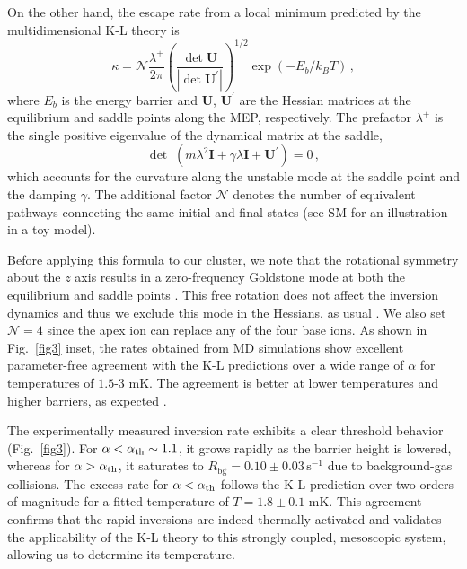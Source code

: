 \documentclass[aps,prl,twocolumn,superscriptaddress,showpacs,floatfix]{revtex4-2}
\begin{document}
On the other hand, the escape rate from a local minimum predicted by the multidimensional K-L theory is~\cite{Langer1969}
\begin{equation}
\kappa = \mathcal{N} \frac{\lambda^+}{2\pi} \left( \frac{\det \mathbf{U}}{|\det \mathbf{U}^{\prime}|} \right)^{1/2} \exp(-E_b /k_B T) \, ,
\end{equation}
where $E_b$ is the energy barrier and $\mathbf{U}$, $\mathbf{U}^{\prime}$ are the Hessian matrices at the equilibrium and saddle points along the MEP, respectively. The prefactor $\lambda^+$ is the single positive eigenvalue of the dynamical matrix at the saddle,
\begin{equation}
    \det \;(m \lambda^2 \mathbf{I} + \gamma \lambda \mathbf{I} + \mathbf{U}^{\prime}) = 0 \, ,
\end{equation}
which accounts for the curvature along the unstable mode at the saddle point and the damping $\gamma$. The additional factor $\mathcal{N}$ denotes the number of equivalent pathways connecting the same initial and final states \cite{Kramers_review_hanggi} (see SM \cite{supp} for an illustration in a toy model).

Before applying this formula to our cluster, we note that the rotational symmetry about the $z$ axis results in a zero-frequency Goldstone mode at both the equilibrium and saddle points \cite{ayyadevara2025}. This free rotation does not affect the inversion dynamics and thus we exclude this mode in the Hessians, as usual \cite{Kramers_review_hanggi}. We also set $\mathcal{N} = 4$ since the apex ion can replace any of the four base ions. As shown in Fig.~\ref{fig3} inset, the rates obtained from MD simulations show excellent parameter-free agreement with the K-L predictions over a wide range of $\alpha$ for temperatures of $1.5$-$3$ mK. The agreement is better at lower temperatures and higher barriers, as expected \cite{Kramers_review_hanggi}.

The experimentally measured inversion rate exhibits a clear threshold behavior (Fig.~\ref{fig3}). For $\alpha < \alpha_{\rm th} \sim 1.1$, it grows rapidly as the barrier height is lowered, whereas for $\alpha > \alpha_{\rm th}$, it saturates to $R_{\text{bg}} = 0.10 \pm 0.03 \, \text{s}^{-1}$ due to background-gas collisions. The excess rate for $\alpha < \alpha_{\rm th}$ follows the K-L prediction over two orders of magnitude for a fitted temperature of $T = 1.8 \pm 0.1$ mK. This agreement confirms that the rapid inversions are indeed thermally activated and validates the applicability of the K-L theory to this strongly coupled, mesoscopic system, allowing us to determine its temperature.
\end{document}
